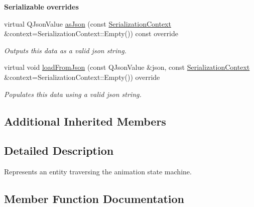 \begin{Indent}\textbf{ Serializable overrides}\par
\begin{DoxyCompactItemize}
\item 
\mbox{\label{classrev_1_1_motion_ab55bc771e5bcdcfdf7e34bf10210ec16}} 
virtual Q\+Json\+Value \mbox{\hyperlink{classrev_1_1_motion_ab55bc771e5bcdcfdf7e34bf10210ec16}{as\+Json}} (const \mbox{\hyperlink{structrev_1_1_serialization_context}{Serialization\+Context}} \&context=Serialization\+Context\+::\+Empty()) const override
\begin{DoxyCompactList}\small\item\em Outputs this data as a valid json string. \end{DoxyCompactList}\item 
\mbox{\label{classrev_1_1_motion_ab0c31b0cc22f4670de0e5b7421ca2f91}} 
virtual void \mbox{\hyperlink{classrev_1_1_motion_ab0c31b0cc22f4670de0e5b7421ca2f91}{load\+From\+Json}} (const Q\+Json\+Value \&json, const \mbox{\hyperlink{structrev_1_1_serialization_context}{Serialization\+Context}} \&context=Serialization\+Context\+::\+Empty()) override
\begin{DoxyCompactList}\small\item\em Populates this data using a valid json string. \end{DoxyCompactList}\end{DoxyCompactItemize}
\end{Indent}
\subsection*{Additional Inherited Members}


\subsection{Detailed Description}
Represents an entity traversing the animation state machine. 

\subsection{Member Function Documentation}
\mbox{\label{classrev_1_1_motion_acae849c523058ac301f3964c132e7629}} 
